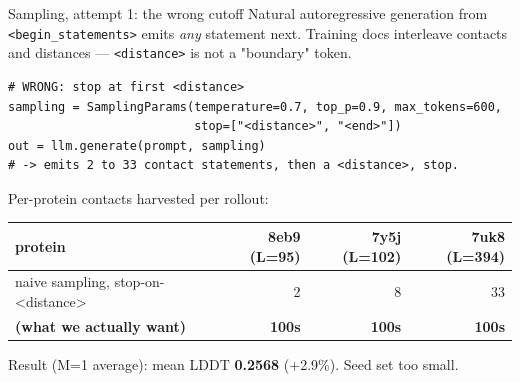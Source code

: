 \documentclass[aspectratio=169,11pt]{beamer}
\newcommand{\codeS}[1]{\texttt{\scriptsize\color{navy}#1}}
\begin{document}
\begin{frame}[fragile]{Sampling, attempt 1: the wrong cutoff}
  Natural autoregressive generation from \codeS{<begin\_statements>}
  emits \emph{any} statement next. Training docs interleave contacts
  and distances — \codeS{<distance>} is not a "boundary" token.
  \begin{lstlisting}[style=codesmall]
# WRONG: stop at first <distance>
sampling = SamplingParams(temperature=0.7, top_p=0.9, max_tokens=600,
                          stop=["<distance>", "<end>"])
out = llm.generate(prompt, sampling)
# -> emits 2 to 33 contact statements, then a <distance>, stop.
  \end{lstlisting}
  Per-protein contacts harvested per rollout:
  \begin{center}\small
    \begin{tabular}{lrrr}
      \toprule
      protein & 8eb9 (L=95) & 7y5j (L=102) & 7uk8 (L=394)\\
      \midrule
      naive sampling, stop-on-<distance> & 2 & 8 & 33 \\
      \textbf{(what we actually want)} & \textbf{100s} & \textbf{100s} & \textbf{100s} \\
      \bottomrule
    \end{tabular}
  \end{center}
  Result (M=1 average): mean LDDT \textbf{0.2568} (+2.9\%). Seed set too small.
\end{frame}
\end{document}
